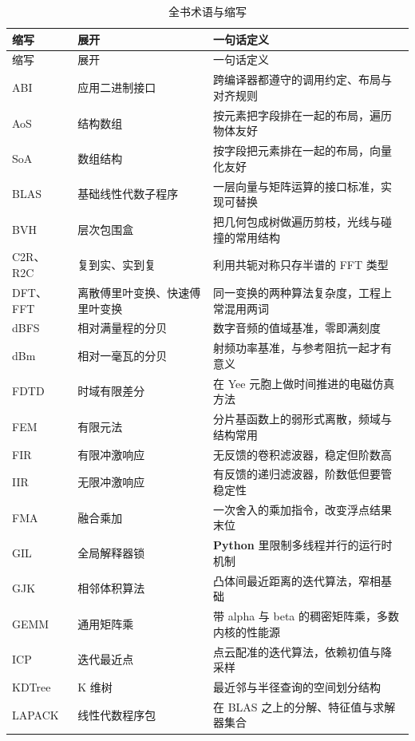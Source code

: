 \documentclass[12pt,a4paper,fontset=fandol]{ctexbook}
\newcommand{\Lang}[1]{\textsf{\bfseries #1}}
\newcommand{\PY}{\Lang{Python}}
\begin{document}
\begin{longtable}{@{}>{\raggedright\arraybackslash}p{}
  >{\raggedright\arraybackslash}p{}
  >{\raggedright\arraybackslash}p{}@{}}
\caption{全书术语与缩写}\label{tab:apC-glossary}\\
\toprule
缩写 & 展开 & 一句话定义 \\
\midrule
\endfirsthead
\toprule
缩写 & 展开 & 一句话定义 \\
\midrule
\endhead
ABI & 应用二进制接口 &
  跨编译器都遵守的调用约定、布局与对齐规则 \\
AoS & 结构数组 &
  按元素把字段排在一起的布局，遍历物体友好 \\
SoA & 数组结构 &
  按字段把元素排在一起的布局，向量化友好 \\
BLAS & 基础线性代数子程序 &
  一层向量与矩阵运算的接口标准，实现可替换 \\
BVH & 层次包围盒 &
  把几何包成树做遍历剪枝，光线与碰撞的常用结构 \\
C2R、R2C & 复到实、实到复 &
  利用共轭对称只存半谱的 FFT 类型 \\
DFT、FFT & 离散傅里叶变换、快速傅里叶变换 &
  同一变换的两种算法复杂度，工程上常混用两词 \\
dBFS & 相对满量程的分贝 &
  数字音频的值域基准，零即满刻度 \\
dBm & 相对一毫瓦的分贝 &
  射频功率基准，与参考阻抗一起才有意义 \\
FDTD & 时域有限差分 &
  在 Yee 元胞上做时间推进的电磁仿真方法 \\
FEM & 有限元法 &
  分片基函数上的弱形式离散，频域与结构常用 \\
FIR & 有限冲激响应 &
  无反馈的卷积滤波器，稳定但阶数高 \\
IIR & 无限冲激响应 &
  有反馈的递归滤波器，阶数低但要管稳定性 \\
FMA & 融合乘加 &
  一次舍入的乘加指令，改变浮点结果末位 \\
GIL & 全局解释器锁 &
  \PY{} 里限制多线程并行的运行时机制 \\
GJK & 相邻体积算法 &
  凸体间最近距离的迭代算法，窄相基础 \\
GEMM & 通用矩阵乘 &
  带 alpha 与 beta 的稠密矩阵乘，多数内核的性能源 \\
ICP & 迭代最近点 &
  点云配准的迭代算法，依赖初值与降采样 \\
KDTree & K 维树 &
  最近邻与半径查询的空间划分结构 \\
LAPACK & 线性代数程序包 &
  在 BLAS 之上的分解、特征值与求解器集合 \\

\end{longtable}
\end{document}
